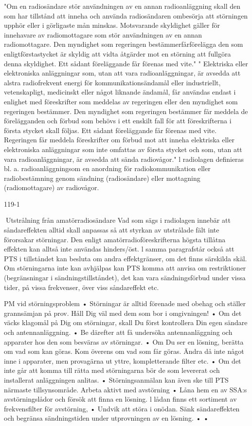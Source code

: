 "Om en radiosändare stör användningen av
en annan radioanläggning skall den som har
tillstånd att inneha och använda radiosändaren ombesörja att störningen upphör eller i
görligaste mån minskas. Motsvarande skyldighet gäller för innehavare av radiomottagare som stör användningen av en annan
radiomottagare.
Den myndighet som regeringen bestämmerfårförelägga den som enligtförstastycket
är skyldig att vidta åtgärder mot en störning
att fullgöra denna skyldighet. Ett sådant föreläggande får förenas med vite."
" Elektriska eller elektroniska anläggningar
som, utan att vara radioanläggningar, är
avsedda att alstra radiofrekvent energi för
kommunikationsändamål eller industriellt,
vetenskapligt, medicinskt eller något liknande ändamål, får användas endast i enlighet
med föreskrifter som meddelas av regeringen eller den myndighet som regeringen bestämmer.
Den myndighet som regeringen bestämmer får meddela de förelägganden och förbud som behövs i ett enskilt fall för att föreskrifterna i första stycket skall följas. Ett
sådant föreläggande får förenas med vite.
Regeringen får meddela föreskrifter om
förbud mot att inneha elektriska eller elektroniska anläggningar som inte omfattas av
första stycket och som, utan att vara radioanläggningar, är avsedda att sända radiovågor."
l radiolagen definieras bl. a. radioanläggningsom en anordning för radiokommunikation eller radiobestämning genom sändning
(radiosändare) eller mottagning (radiomottagare) av radiovågor.

119-1

Utstrålning från amatörradiosändare
Vad som sägs i radiolagen innebär att
såndareffekten alltid skall anpassas så att
styrkan av utstrålade fält inte förorsakar störningar. Den enligt amatörradioföreskrifterna
högsta tillåtna effekten kan alltså inte användas hinders/öst. l samma paragrafstår också
att PTS i tillståndet kan besluta om andra
effektgränser, om det finns särskilda skäl.
Om störningarna inte kan avhjälpas kan
PTS komma att anvisa om restriktioner (begränsningar i sändningstillståndet), det kan
vara sändningsförbud under vissa tider, på
vissa frekvenser, över viss såndareffekt etc.

PM vid störningsproblem
• Störningar är alltid förenade med obehag
och ställer grannsämjan på prov. Håll Dig
väl med dem som bor i omgivningen!
• Om det väcks klagomål på Dig om störningar, skall Du först kontrollera Din egen
sändare och antennanläggning.
• Be därefter att få undersöka antennanläggning och apparater hos den som besväras av störningar.
• Om Du ser en lösning, berätta om vad
som kan göras. Kom överens om vad
som får göras. Ändra då inte något inne i
apparater, men provagärna ut yttre, kompletterande filter etc.
• Om det inte går att komma till rätta med
störningarna bör de som levererat och
installerat anläggningen anlitas.
• Störningsanmälan kan även ske till PTS
närmaste tillsynsområde.
Arbeta aktivt med avstörning
• Låna hem en av SSA:s avstörningslådor
och försök att finna en lösning. l lådan
finns ett sortiment av frekvensfilter för
avstörning,
• Undvik att störa i onödan. Sänk sändareffekten och begränsa sändningstiden
under utprovningen av en lösning.
•
•

